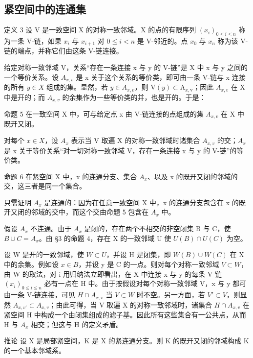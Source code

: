 \subsection{紧空间中的连通集}

定义 3 设 V 是一致空间 X 的对称一致邻域。X 的点的有限序列 \((x_{i})_{0\leqslant i\leqslant n}\) 称为一条 V-链，如果 \(x_{i}\) 与 \(x_{i+1}\) 对 \(0\leqslant i<n\) 是 V-邻近的。点 \(x_{0}\) 与 \(x_{n}\) 称为该 V-链的端点，并称它们由这条 V-链连接。

给定对称一致邻域 V，关系“存在一条连接 x 与 y 的 V-链”是 X 中 x 与 y 之间的一个等价关系。设 \(A_{x,v}\) 是 x 关于这个关系的等价类，即可由一条 V-链与 x 连接的所有 \(y \in X\) 组成的集。显然，若 \(y \in A_{x,v}\)，则 \(\mathrm{V}(y) \subset \mathrm{A}_{x,\mathrm{v}}\)；因此 \(A_{x,v}\) 在 X 中是开的；而 \(A_{x,v}\) 的余集作为一些等价类的并，也是开的。于是：

命题 5 在一致空间 X 中，可与给定点 x 由 V-链连接的点组成的集 \(A_{x,v}\) 在 X 中既开又闭。

对每个 \(x \in X\)，设 \(A_{x}\) 表示当 V 取遍 X 的对称一致邻域时诸集合 \(A_{x,v}\) 的交；\(A_{x}\) 是 x 关于等价关系“对一切对称一致邻域 V，存在一条连接 x 与 y 的 V-链”的等价类。

命题 6 在紧空间 X 中，x 的连通分支、集合 \(A_{x}\)、以及 x 的既开又闭的邻域的交，这三者是同一个集合。

只需证明 \(A_{x}\) 是连通的：因为在任意一致空间 X 中，x 的连通分支包含在 x 的既开又闭的邻域的交中，而这个交由命题 5 包含在 \(A_{x}\) 中。

假设 \(A_{x}\) 不连通。由于 \(A_{x}\) 是闭的，存在两个不相交的非空闭集 B 与 C，使 \(B \cup C = A_{x}\)。由 §3 的命题 4，存在 X 的一致邻域 U 使 \(U(B) \cap U(C)\) 为空。

设 W 是开的一致邻域，使 \(\hat{W} \subset U\)，并设 H 是闭集，即 \(W(B) \cup W(C)\) 在 X 中的余集。例如设 \(x \in B\)，并设 y 是 C 的一点。则对每个对称一致邻域 \(V \subset W\)，由 W 的取法，对 i 用归纳法立即看出，在 X 中连接 x 与 y 的每条 V-链 \((x_{i})_{0 \leqslant i \leqslant n}\) 必有一点在 H 中。由于按假设对每个对称一致邻域 V，x 与 y 都可由一条 V-链连接，可见 \(H \cap A_{x,v}\) 当 \(V \subset W\) 时不空。另一方面，若 \(V' \subset V\)，则显然 \(A_{x,v'} \subset A_{x,v}\)；由此可得，当 V 取遍 X 的对称一致邻域时，诸集合 \(H \cap A_{x,v}\) 在紧空间 H 中构成一个由闭集组成的滤子基。因此所有这些集合有一公共点，从而 H 与 \(A_{x}\) 相交；但这与 H 的定义矛盾。

推论 设 X 是局部紧空间，K 是 X 的紧连通分支。则 K 的既开又闭的邻域构成 K 的一个基本邻域系。

